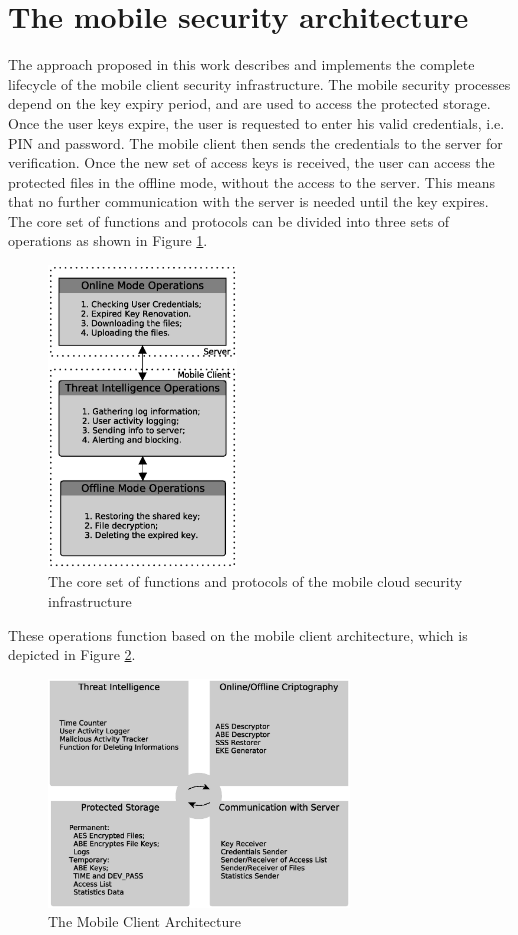 \documentclass[twocolumn]{svjour3}          	%
\begin{document}
\section{The mobile security architecture}
\label{sec_the_client_security_architecture}
The approach proposed in this work describes and implements the complete lifecycle of the mobile client security infrastructure. The mobile security processes depend on the key expiry period, and are used to access the protected storage. Once the user keys expire, the user is requested to enter his valid credentials, i.e. PIN and password. The mobile client then sends the credentials to the server for verification. Once the new set of access keys is received, the user can access the protected files in the offline mode, without the access to the server. This means that no further communication with the server is needed until the key expires. The core set of functions and protocols can be divided into three sets of operations as shown in Figure \ref{fig:1}.

\begin{figure}[h!]
	\centering
	\includegraphics[width=5cm]{figures/coresetoffunctionsandprotocols.eps}
	\caption{The core set of functions and protocols of the mobile cloud security infrastructure}
	\label{fig:1}
\end{figure}

These operations function based on the mobile client architecture, which is depicted in Figure \ref{fig:2}. 

\begin{figure}[h!]
	\centering
	\includegraphics[width=8cm]{figures/mobileclientarchitecture.eps}
	\caption{The Mobile Client Architecture}
	\label{fig:2}
\end{figure}
\end{document}
